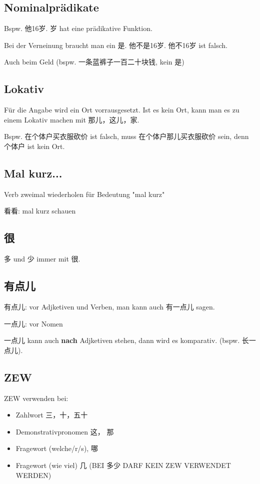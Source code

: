 \documentclass[UTF8]{ctexart}
\begin{document}
\subsection{Nominalprädikate}

Bspw. 他16岁. 岁 hat eine prädikative Funktion.

Bei der Verneinung braucht man ein 是. 他不是16岁. 他不16岁 ist falsch.

Auch beim Geld (bspw. 一条蓝裤子一百二十块钱, kein 是)

\subsection{Lokativ}

Für die Angabe wird ein Ort vorrausgesetzt. Ist es kein Ort, kann man es zu einem Lokativ machen mit 那儿，这儿，家.

Bspw. 在个体户买衣服砍价 ist falsch, muss 在个体户那儿买衣服砍价 sein, denn 个体户 ist kein Ort.\\

\subsection{Mal kurz...}

Verb zweimal wiederholen für Bedeutung "mal kurz"

看看: mal kurz schauen

\subsection{很}

多 und 少 immer mit 很.

\subsection{有点儿}

有点儿: vor Adjketiven und Verben, man kann auch 有一点儿 sagen.

一点儿: vor Nomen

一点儿 kann auch \textbf{nach} Adjketiven stehen, dann wird es komparativ. (bspw. 长一点儿). 


\subsection{ZEW}

ZEW verwenden bei:

\begin{itemize}
    \item Zahlwort 三，十，五十
    \item Demonstrativpronomen 这， 那
    \item Fragewort (welche/r/s), 哪
    \item Fragewort (wie viel) 几 (BEI 多少 DARF KEIN ZEW VERWENDET WERDEN)
\end{itemize}
\end{document}
